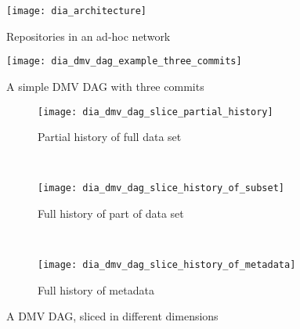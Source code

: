 \documentclass[
    usenglish,
]{nik}
\begin{document}

\begin{figure}[]
    \centering
    \texttt{[image: dia\_architecture]}
    \caption{Repositories in an ad-hoc network}
    \label{fig:dia_architecture}
\end{figure}

\begin{figure}[]
    \centering
    \texttt{[image: dia\_dmv\_dag\_example\_three\_commits]}
    \caption{A simple DMV DAG with three commits}
    \label{dia_dmv_dag_example_three_commits}
\end{figure}


\newcommand{\slicediagramwidth}{0.45\textwidth}

\begin{figure}[]

    \centering

    \begin{subfigure}[]{\slicediagramwidth}
        \texttt{[image: dia\_dmv\_dag\_slice\_partial\_history]}
        \caption{Partial history of full data set}
        \label{dia_dmv_dag_slice_partial_history}
    \end{subfigure}
    ~
    \begin{subfigure}[]{\slicediagramwidth}
        \texttt{[image: dia\_dmv\_dag\_slice\_history\_of\_subset]}
        \caption{Full history of part of data set}
        \label{dia_dmv_dag_slice_history_of_subset}
    \end{subfigure}
    ~
    \begin{subfigure}[]{\slicediagramwidth}
        \texttt{[image: dia\_dmv\_dag\_slice\_history\_of\_metadata]}
        \caption{Full history of metadata}
        \label{dia_dmv_dag_slice_history_of_metadata}
    \end{subfigure}

    \caption{A DMV DAG, sliced in different dimensions}
\end{figure}
\end{document}
